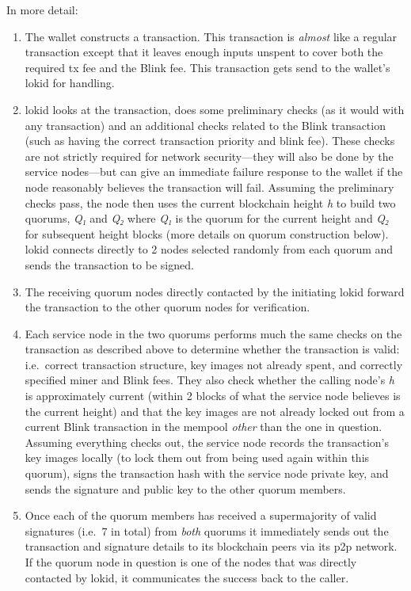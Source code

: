 In more detail:

\begin{enumerate}
\def\labelenumi{\arabic{enumi}.}
\item
  The wallet constructs a transaction. This transaction is \emph{almost}
  like a regular transaction except that it leaves enough inputs unspent
  to cover both the required tx fee and the Blink fee. This transaction
  gets send to the wallet's lokid for handling.
\item
  lokid looks at the transaction, does some preliminary checks (as it
  would with any transaction) and an additional checks related to the
  Blink transaction (such as having the correct transaction priority and
  blink fee). These checks are not strictly required for network
  security---they will also be done by the service nodes---but can give
  an immediate failure response to the wallet if the node reasonably
  believes the transaction will fail. Assuming the preliminary checks
  pass, the node then uses the current blockchain height \emph{h} to
  build two quorums, \emph{Q₁} and \emph{Q₂} where \emph{Q₁} is the
  quorum for the current height and \emph{Q₂} for subsequent height
  blocks (more details on quorum construction below). lokid connects
  directly to 2 nodes selected randomly from each quorum and sends the
  transaction to be signed.
\item
  The receiving quorum nodes directly contacted by the initiating lokid
  forward the transaction to the other quorum nodes for verification.
\item
  Each service node in the two quorums performs much the same checks on
  the transaction as described above to determine whether the
  transaction is valid: i.e.~correct transaction structure, key images
  not already spent, and correctly specified miner and Blink fees. They
  also check whether the calling node's \emph{h} is approximately
  current (within 2 blocks of what the service node believes is the
  current height) and that the key images are not already locked out
  from a current Blink transaction in the mempool \emph{other} than the
  one in question. Assuming everything checks out, the service node
  records the transaction's key images locally (to lock them out from
  being used again within this quorum), signs the transaction hash with
  the service node private key, and sends the signature and public key
  to the other quorum members.
\item
  Once each of the quorum members has received a supermajority of valid
  signatures (i.e.~7 in total) from \emph{both} quorums it immediately
  sends out the transaction and signature details to its blockchain
  peers via its p2p network. If the quorum node in question is one of
  the nodes that was directly contacted by lokid, it communicates the
  success back to the caller.


\end{enumerate}

